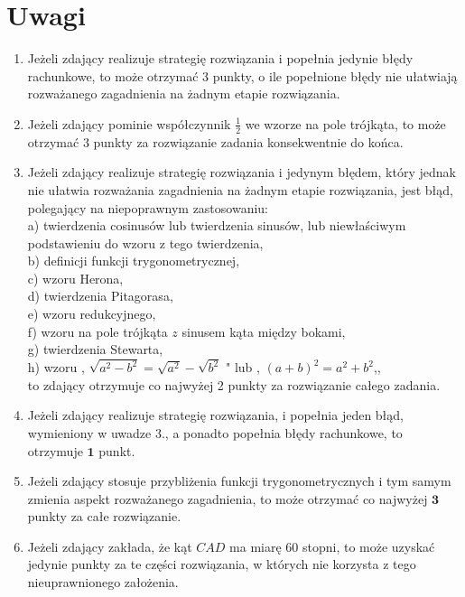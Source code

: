 \documentclass[10pt]{article}
\begin{document}
\section*{Uwagi}
\begin{enumerate}
  \item Jeżeli zdający realizuje strategię rozwiązania i popełnia jedynie błędy rachunkowe, to może otrzymać 3 punkty, o ile popełnione błędy nie ułatwiają rozważanego zagadnienia na żadnym etapie rozwiązania.
  \item Jeżeli zdający pominie współczynnik $\frac{1}{2}$ we wzorze na pole trójkąta, to może otrzymać 3 punkty za rozwiązanie zadania konsekwentnie do końca.
  \item Jeżeli zdający realizuje strategię rozwiązania i jedynym błędem, który jednak nie ułatwia rozważania zagadnienia na żadnym etapie rozwiązania, jest błąd, polegający na niepoprawnym zastosowaniu:\\
a) twierdzenia cosinusów lub twierdzenia sinusów, lub niewłaściwym podstawieniu do wzoru z tego twierdzenia,\\
b) definicji funkcji trygonometrycznej,\\
c) wzoru Herona,\\
d) twierdzenia Pitagorasa,\\
e) wzoru redukcyjnego,\\
f) wzoru na pole trójkąta $z$ sinusem kąta między bokami,\\
g) twierdzenia Stewarta,\\
h) wzoru , $\sqrt{a^{2}-b^{2}}=\sqrt{a^{2}}-\sqrt{b^{2}}$ " lub , $(a+b)^{2}=a^{2}+b^{2}$,,\\
to zdający otrzymuje co najwyżej 2 punkty za rozwiązanie całego zadania.
  \item Jeżeli zdający realizuje strategię rozwiązania, i popełnia jeden błąd, wymieniony w uwadze 3., a ponadto popełnia błędy rachunkowe, to otrzymuje $\mathbf{1}$ punkt.
  \item Jeżeli zdający stosuje przybliżenia funkcji trygonometrycznych i tym samym zmienia aspekt rozważanego zagadnienia, to może otrzymać co najwyżej $\mathbf{3}$ punkty za całe rozwiązanie.
  \item Jeżeli zdający zakłada, że kąt $C A D$ ma miarę 60 stopni, to może uzyskać jedynie punkty za te części rozwiązania, w których nie korzysta z tego nieuprawnionego założenia.
\end{enumerate}
\end{document}
